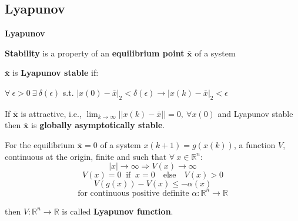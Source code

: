 
\subsection{Lyapunov}

\begin{sstTitleBox}[Plum]{\center\textbf{\large
			Lyapunov
		}}

	\begin{sstOnlyFrame}[Plum]
		\textbf{Stability} is a property of an
		\textbf{equilibrium point} $\bar{\mathbf{x}}$
		of a system
	\end{sstOnlyFrame}

	\begin{sstOnlyFrame}[Plum]
		\begin{definition}
			$\bar{\mathbf{x}}$ is \textbf{Lyapunov stable} if:

			$\forall\ \epsilon>0\ \exists\ \delta(\epsilon)$ s.t.
			$| x(0) - \bar{x} |_{\scriptscriptstyle 2}< \delta(\epsilon) \to
				| x(k) - \bar{x}|_{\scriptscriptstyle 2} < \epsilon$
		\end{definition}
	\end{sstOnlyFrame}

	\begin{sstOnlyFrame}[Plum]
		\begin{definition}
			If $\bar{\mathbf{x}}$ is attractive, i.e.,
			$\lim_{k\to\infty} ||x(k)-\bar{x}||=0,\ \forall x(0)$
			and Lyapunov stable
			then $\bar{\mathbf{x}}$ is \textbf{globally asymptotically stable}.
		\end{definition}
	\end{sstOnlyFrame}

	\begin{sstOnlyFrame}[Plum]
		\begin{definition}
			For the equilibrium $\bar{\mathbf{x}}=0$
			of a system $x(k+1)=g(x(k))$,
			a function $V$, continuous at the origin,
			finite and such that
			$\forall\ x\in \mathbb{R}^{n}$:
			\[
				|x|   \to\infty              \Rightarrow V(x)  \to\infty\]
			\[
				V(x)=0 \ \text{ if }\ x=0 \quad\text{else}\quad V(x)>0             \]
			\[
				V(g(x)) - V(x) \leq -\alpha(x)                          \]
			\[
				\text{for continuous positive definite }
				\alpha:\mathbb{R}^n\to \mathbb{R}
			\]

			then  $V:\mathbb{R}^n\to \mathbb{R}$
			is called \textbf{Lyapunov function}.
		\end{definition}
	\end{sstOnlyFrame}


\end{sstTitleBox}
